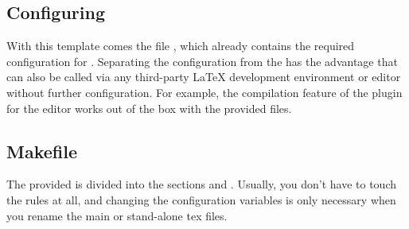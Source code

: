 \subsection{Configuring }
With this template comes the file , which already contains
the required configuration for . Separating the configuration
from the  has the advantage that  can also be
called via any third-party \LaTeX{} development environment or editor without
further configuration. For example, the compilation feature of the
 plugin for the editor  works out of the box with
the provided files.


\subsection{Makefile}%
\label{sub:make}

The provided  is divided into the sections  and
. Usually, you don't have to touch the rules at all, and
changing the configuration variables is only necessary when you rename the
main or stand-alone tex files.

